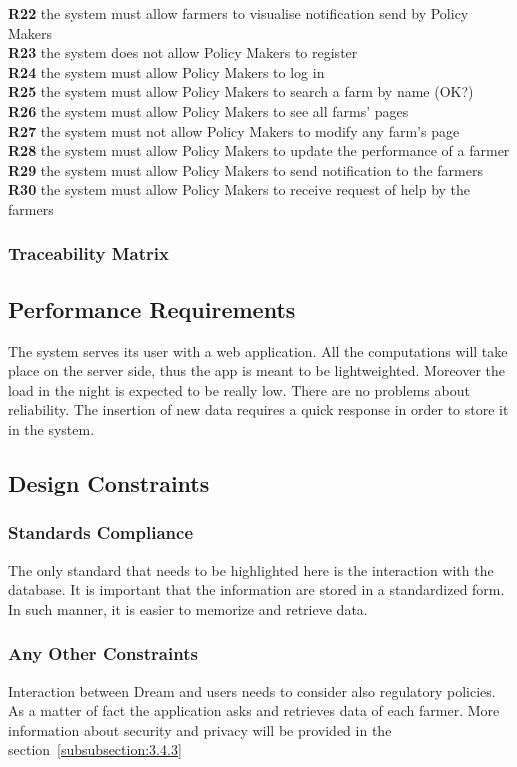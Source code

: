 \textbf{R22} the system must allow farmers to visualise notification send by Policy Makers\\
\textbf{R23} the system does not allow Policy Makers to register\\
\textbf{R24} the system must allow Policy Makers to log in\\
\textbf{R25} the system must allow Policy Makers to search a farm by name (OK?)\\
\textbf{R26} the system must allow Policy Makers to see all farms’ pages\\
\textbf{R27} the system must not allow Policy Makers to modify any farm’s page\\
\textbf{R28} the system must allow Policy Makers to update the performance of a farmer\\
\textbf{R29} the system must allow Policy Makers to send notification to the farmers\\
\textbf{R30} the system must allow Policy Makers to receive request of help by the farmers\\
\subsubsection{Traceability Matrix}

\subsection{Performance Requirements}
The system serves its user with a web application. All the computations will take place on the server side, 
thus the app is meant to be lightweighted. Moreover the load in the night is expected to be really low.
There are no problems about reliability. The insertion of new data requires a quick response in order to store 
it in the system.

\subsection{Design Constraints}
\subsubsection{Standards Compliance}
The only standard that needs to be highlighted here is the interaction with the database. It is important that the information are stored 
in a standardized form. In such manner, it is easier to memorize and retrieve data.


\subsubsection{Any Other Constraints}
Interaction between Dream and users needs to consider also regulatory policies.
As a matter of fact the application asks and retrieves data of each farmer.
More information about security and privacy will be provided in the section~\ref{subsubsection:3.4.3}


